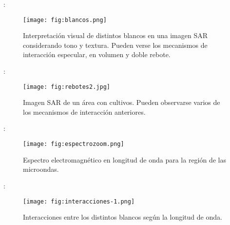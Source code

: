 \begin{frame}{\secname : \subsecname}
    \begin{figure}
      \centering
      \texttt{[image: fig:blancos.png]}
      \caption{Interpretación visual de distintos blancos en una imagen SAR considerando tono y textura. Pueden verse los mecanismos de interacción especular, en volumen y doble rebote.}
      \label{}
    \end{figure}
\end{frame}

\begin{frame}{\secname : \subsecname}
    \begin{figure}
      \centering
      \texttt{[image: fig:rebotes2.jpg]}
      \caption{Imagen SAR de un área con cultivos. Pueden observarse varios de los mecanismos de interacción anteriores.}
      \label{}
    \end{figure}
\end{frame}

\begin{frame}{\secname : \subsecname}
  \begin{figure}
    \centering
    \texttt{[image: fig:espectrozoom.png]}
    \caption{Espectro electromagnético en longitud de onda para la región de las microondas.}
    \label{}
  \end{figure}
\end{frame}


\begin{frame}{\secname : \subsecname}
    \begin{figure}
      \centering
      \texttt{[image: fig:interacciones-1.png]}
      \caption{Interacciones entre los distintos blancos según la longitud de onda.}
      \label{}
    \end{figure}
\end{frame}

